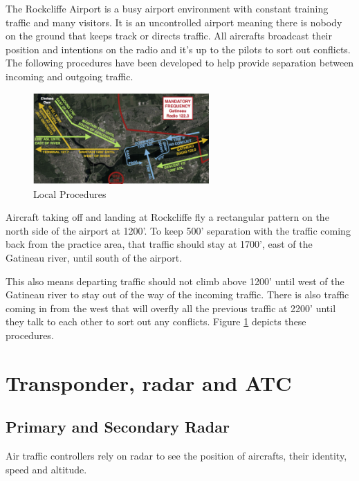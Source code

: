 \documentclass[12pt,letterpaper]{article}
\begin{document}
        The Rockcliffe Airport is a busy airport environment with constant training traffic and many visitors. It is an uncontrolled airport meaning there is nobody on the ground that keeps track or directs traffic. All aircrafts broadcast their position and intentions on the radio and it's up to the pilots to sort out conflicts. The following procedures have been developed to help provide separation between incoming and outgoing traffic.
        
        \begin{figure}
          \begin{center}
            \includegraphics[width=0.6\textwidth]{cyro-local.png}
          \end{center}
          \caption{Local Procedures}
          \label{fig:local-procedures}
        \end{figure}

        Aircraft taking off and landing at Rockcliffe fly a rectangular pattern on the north side of the airport at 1200'. To keep 500' separation with the traffic coming back from the practice area, that traffic should stay at 1700', east of the Gatineau river, until south of the airport.
        
        This also means departing traffic should not climb above 1200' until west of the Gatineau river to stay out of the way of the incoming traffic. There is also traffic coming in from the west that will overfly all the previous traffic at 2200' until they talk to each other to sort out any conflicts. Figure \ref{fig:local-procedures} depicts these procedures.
        
        
 \section{Transponder, radar and ATC}
        \subsection{Primary and Secondary Radar}
        Air traffic controllers rely on radar to see the position of aircrafts, their identity, speed and altitude.
        
\end{document}
